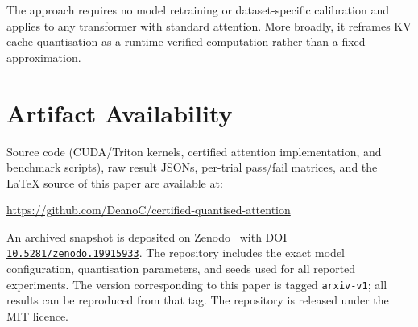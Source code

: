 \documentclass[10pt,twocolumn,a4paper]{article}
\theoremstyle{definition}
\theoremstyle{remark}
\begin{document}
The approach requires no model retraining or dataset-specific calibration and applies to any transformer with standard attention.  More broadly, it reframes KV cache quantisation as a runtime-verified computation rather than a fixed approximation.



\section*{Artifact Availability}

Source code (CUDA/Triton kernels, certified attention implementation, and benchmark scripts), raw result JSONs, per-trial pass/fail matrices, and the \LaTeX{} source of this paper are available at:
\begin{center}
\url{https://github.com/DeanoC/certified-quantised-attention}
\end{center}
An archived snapshot is deposited on Zenodo~\cite{zenodo_artifact} with DOI \href{https://doi.org/10.5281/zenodo.19915933}{\texttt{10.5281/zenodo.19915933}}.
The repository includes the exact model configuration, quantisation parameters, and seeds used for all reported experiments.  The version corresponding to this paper is tagged \texttt{arxiv-v1}; all results can be reproduced from that tag.  The repository is released under the MIT licence.
\end{document}
